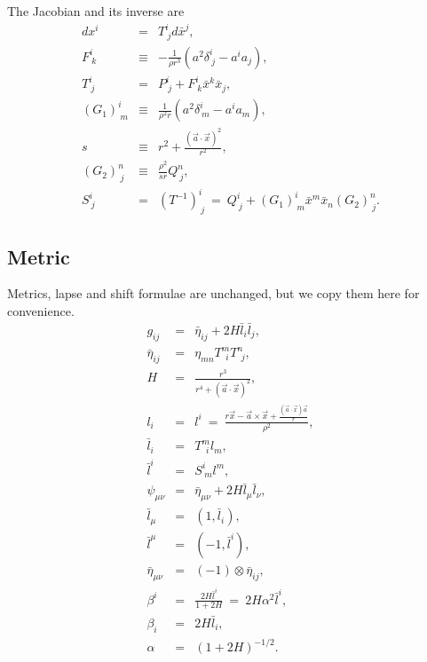 \documentclass{article}
\begin{document}
The Jacobian and its inverse are
\begin{eqnarray}
dx^i &=& T^i_{\ j} d\bar{x}^j, \\
F^i_{\ k} &\equiv& -\frac{1}{\rho r^3}(a^2\delta^i_{\ j}-a^ia_j), \\
T^i_{\ j} &=& P^i_{\ j} +F^i_{\ k}\bar{x}^k\bar{x}_j, \\
(G_1)^i_{\ m} &\equiv& \frac{1}{\rho^2 r}(a^2\delta^i_{\ m}-a^ia_m), \\
s &\equiv& r^2+\frac{(\vec{a}\cdot\vec{x})^2}{r^2}, \\
(G_2)^n_{\ j} &\equiv& \frac{\rho^2}{sr} Q^n_{\ j}, \\
S^i_{\ j} &=& (T^{-1})^i_{\ j} \ =\ Q^i_{\ j} +(G_1)^i_{\ m}\bar{x}^m\bar{x}_n(G_2)^n_{\ j}.
\end{eqnarray}

\subsection{Metric}
Metrics, lapse and shift formulae are unchanged, but we copy them here for convenience.
\begin{eqnarray}
g_{ij} &=& \bar{\eta}_{ij} +2H\bar{l}_i\bar{l}_j, \\
\bar{\eta}_{ij} &=& \eta_{mn} T^m_{\ \ i} T^n_{\ \ j}, \\
H &=& \frac{r^3}{r^4 + (\vec{a}\cdot \vec{x})^2}, \\
l_i &=& l^i \ =\  \frac{r\vec{x}-\vec{a}\times\vec{x}+\displaystyle\frac{(\vec{a}\cdot\vec{x})\vec{a}}{r}}{\rho^2}, \\
\bar{l}_i &=& T^m_{\ \ i} l_m, \\
\bar{l}^i &=& S^i_{\ m} l^m, \\
\psi_{\mu\nu} &=& \bar{\eta}_{\mu\nu} + 2 H \bar{l}_\mu \bar{l}_\nu, \\
\bar{l}_{\mu} &=& (1, \bar{l}_i), \\
\bar{l}^{\mu} &=& (-1, \bar{l}^i), \\
\bar{\eta}_{\mu\nu} &=& (-1)\otimes \bar{\eta}_{ij}, \\
\beta^i &=& \frac{2 H \bar{l}^i}{1+2H}\ = \ 2 H \alpha^2 \bar{l}^i,\\
\beta_i &=& 2 H \bar{l}_i, \\
\alpha &=& (1+2 H)^{-1/2}.
\end{eqnarray}
\end{document}
